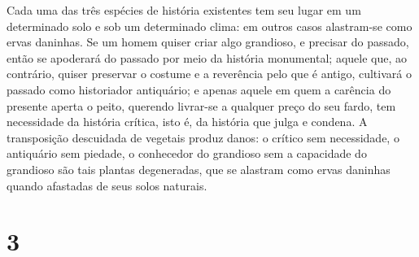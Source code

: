 Cada uma das três espécies de história existentes tem seu lugar em um
determinado solo e sob um determinado clima: em outros casos alastram-se
como ervas daninhas. Se um homem quiser criar algo grandioso, e 
precisar do passado, então se apoderará do passado por meio da
história monumental; aquele que, ao contrário, quiser preservar o
costume e a reverência pelo que é antigo, cultivará o passado como
historiador antiquário; e apenas aquele em quem a carência do presente
aperta o peito, querendo livrar-se a qualquer preço do seu fardo, tem
necessidade da história crítica, isto é, da história que julga e
condena. A transposição descuidada de vegetais produz danos: o crítico
sem necessidade, o antiquário sem piedade, o conhecedor do grandioso sem
a capacidade do grandioso são tais plantas degeneradas, que se alastram
como ervas daninhas quando afastadas de seus solos naturais.

\chapter{3}\label{capuxedtulo-3}

